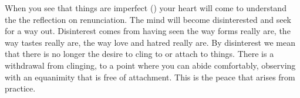 When you see that things are imperfect () your heart will come to understand the  the reflection on renunciation. The mind will become disinterested and seek for a way out. Disinterest comes from having seen the way forms really are, the way tastes really are, the way love and hatred really are. By disinterest we mean that there is no longer the desire to cling to or attach to things. There is a withdrawal from clinging, to a point where you can abide comfortably, observing with an equanimity that is free of attachment. This is the peace that arises from practice.

